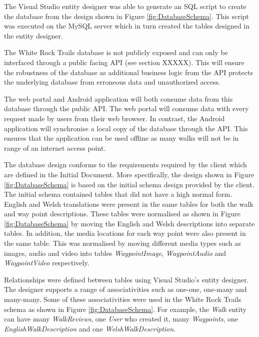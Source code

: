 \documentclass[11pt,a4paper]{article}
\begin{document}
The Visual Studio entity designer was able to generate an SQL script to create the database from the design shown in Figure \ref{fig:DatabaseSchema}. This script was executed on the MySQL server which in turn created the tables designed in the entity designer.

The White Rock Trails database is not publicly exposed and can only be interfaced through a public facing API (see section XXXXX). 
This will ensure the robustness of the database as additional business logic from the API protects the underlying database from erroneous data and unauthorized access.

The web portal and Android application will both consume data from this database through the public API. 
The web portal will consume data with every request made by users from their web browser. 
In contrast, the Android application will synchronise a local copy of the database through the API. 
This ensures that the application can be used offline as many walks will not be in range of an internet access point.

The database design conforms to the requirements required by the client which are defined in the Initial Document. 
More specifically, the design shown in Figure \ref{fig:DatabaseSchema} is based on the initial schema design provided by the client. 
The initial schema contained tables that did not have a high normal form. 
English and Welsh translations were present in the same tables for both the walk and way point descriptions. 
These tables were normalised as shown in Figure \ref{fig:DatabaseSchema} by moving the English and Welsh descriptions into separate tables.
In addition, the media locations for each way point were also present in the same table.
This was normalised by moving different media types such as images, audio and video into tables \emph{WaypointImage}, \emph{WaypointAudio} and \emph{WaypointVideo} respectively.

Relationships were defined between tables using Visual Studio's entity designer. 
The designer supports a range of associativities such as one-one, one-many and many-many. 
Some of these associativities were used in the White Rock Trails schema as shown in Figure \ref{fig:DatabaseSchema}.
For example, the \emph{Walk} entity can have many \emph{WalkReviews}, one \emph{User} who created it, many \emph{Waypoints}, one \emph{EnglishWalkDescription} and one \emph{WelshWalkDescription}.
\end{document}
